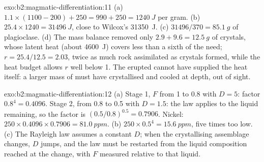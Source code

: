 \begin{solution}{exo:b2:magmatic-differentiation:11}
(a) $1.1\times(1100 - 200) + 250 = 990 + 250 = \qty{1240}{J}$ per gram. (b)
$25.4\times1240 = \qty{31496}{J}$, close to Wilcox's \qty{31350}{J}. (c)
$31496/370 = \qty{85.1}{g}$ of plagioclase. (d) The mass balance removed only $2.9 +
9.6 = \qty{12.5}{g}$ of crystals, whose latent heat (about \qty{4600}{J}) covers less
than a sixth of the need; $r = 25.4/12.5 = 2.03$, twice as much rock assimilated as
crystals formed, while the heat budget allows $r$ well below 1. The erupted 
cannot have supplied the heat itself: a larger mass of  must have crystallised
and cooled at depth, out of sight.
\end{solution}

\begin{solution}{exo:b2:magmatic-differentiation:12}
(a) Stage 1, $F$ from 1 to 0.8 with $D = 5$: factor $0.8^{4} = 0.4096$. Stage 2,
from 0.8 to 0.5 with $D = 1.5$: the law applies to the liquid remaining, so the
factor is $(0.5/0.8)^{0.5} = 0.7906$. Nickel: $250\times0.4096\times0.7906 =
\qty{81.0}{ppm}$. (b) $250\times0.5^{4} = \qty{15.6}{ppm}$, five times too low. (c)
The Rayleigh law assumes a constant $D$; when the crystallising assemblage changes,
$D$ jumps, and the law must be restarted from the liquid composition reached at the
change, with $F$ measured relative to that liquid.
\end{solution}

